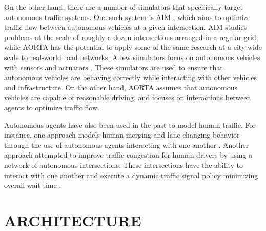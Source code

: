 \documentclass[letterpaper, 10 pt, conference]{ieeeconf}  %
\begin{document}
On the other hand, there are a number of simulators that specifically
target autonomous traffic systems. One such system is AIM
\cite{JAIR08-dresner}, which aims to optimize traffic flow between
autonomous vehicles at a given intersection. AIM studies problems at
the scale of roughly a dozen intersections arranged in a regular grid,
while AORTA has the potential to apply some of the same research at a
city-wide scale to real-world road networks. A few simulators focus on
autonomous vehicles with sensors and actuators
\cite{figueiredo2009approach}. These simulators are used to ensure
that autonomous vehicles are behaving correctly while interacting with
other vehicles and infrastructure. On the other hand, AORTA assumes
that autonomous vehicles are capable of reasonable driving, and
focuses on interactions between agents to optimize traffic flow.

Autonomous agents have also been used in the past to model human
traffic. For instance, one approach models human merging and lane
changing behavior through the use of autonomous agents interacting
with one another \cite{hidas2002modelling}. Another approach attempted
to improve traffic congestion for human drivers by using a network of
autonomous intersections.  These intersections have the ability to
interact with one another and execute a dynamic traffic signal policy
minimizing overall wait time \cite{manikonda2001autonomous}.



\section{ARCHITECTURE}
\label{sec:arch}
\end{document}
